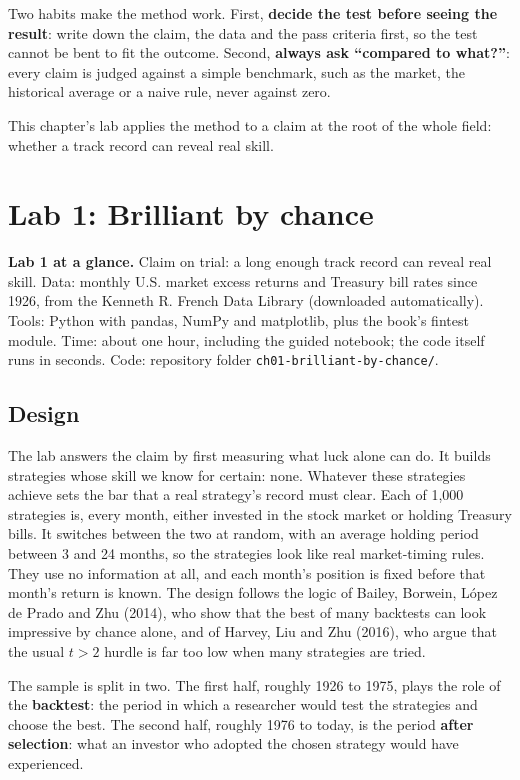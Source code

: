 Two habits make the method work. First, \textbf{decide the test before seeing the result}: write down the claim, the data and the pass criteria first, so the test cannot be bent to fit the outcome. Second, \textbf{always ask ``compared to what?''}: every claim is judged against a simple benchmark, such as the market, the historical average or a naive rule, never against zero.

This chapter's lab applies the method to a claim at the root of the whole field: whether a track record can reveal real skill.

\section{Lab 1: Brilliant by chance}
\label{sec:01-lab}

\begin{callout}
\textbf{Lab 1 at a glance.} Claim on trial: a long enough track record can reveal real skill. Data: monthly U.S. market excess returns and Treasury bill rates since 1926, from the Kenneth R. French Data Library (downloaded automatically). Tools: Python with pandas, NumPy and matplotlib, plus the book's fintest module. Time: about one hour, including the guided notebook; the code itself runs in seconds. Code: repository folder \texttt{ch01-brilliant-by-chance/}.
\end{callout}

\subsection*{Design}

The lab answers the claim by first measuring what luck alone can do. It builds strategies whose skill we know for certain: none. Whatever these strategies achieve sets the bar that a real strategy's record must clear. Each of 1,000 strategies is, every month, either invested in the stock market or holding Treasury bills. It switches between the two at random, with an average holding period between 3 and 24 months, so the strategies look like real market-timing rules. They use no information at all, and each month's position is fixed before that month's return is known. The design follows the logic of Bailey, Borwein, L\'opez de Prado and Zhu (2014), who show that the best of many backtests can look impressive by chance alone, and of Harvey, Liu and Zhu (2016), who argue that the usual $t > 2$ hurdle is far too low when many strategies are tried.

The sample is split in two. The first half, roughly 1926 to 1975, plays the role of the \textbf{backtest}: the period in which a researcher would test the strategies and choose the best. The second half, roughly 1976 to today, is the period \textbf{after selection}: what an investor who adopted the chosen strategy would have experienced.

